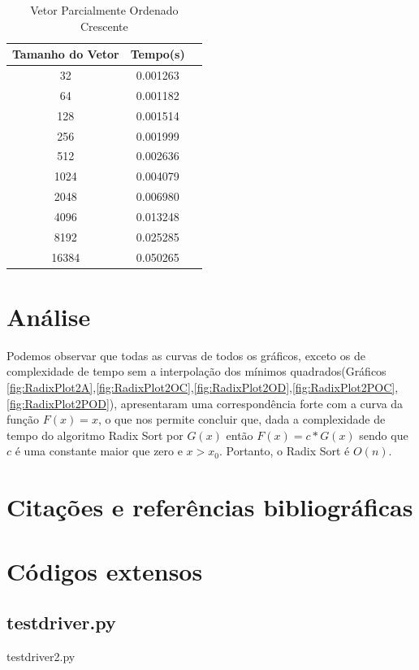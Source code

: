 \documentclass[12pt,a4paper,twoside]{report}
\begin{document}
\begin{table}[h]
  \centering
  \caption{Vetor Parcialmente Ordenado Crescente \label{tab:poc}}
  \begin{tabular}{ccc} \\\hline
  \textbf{Tamanho do Vetor}  & \textbf{Tempo(s)} \\\hline
  32                              & 0.001263          \\\hline
  64                              & 0.001182          \\\hline
  128                             & 0.001514          \\\hline
  256                             & 0.001999          \\\hline
  512                             & 0.002636          \\\hline
  1024                            & 0.004079          \\\hline
  2048                            & 0.006980          \\\hline
  4096                            & 0.013248
  \\\hline
  8192                            & 0.025285
  \\\hline
  16384                           & 0.050265
  \\\hline
  \end{tabular}
\end{table}


\chapter{Análise}

Podemos observar que todas as curvas de todos os gráficos, exceto os de complexidade de tempo sem a interpolação dos mínimos quadrados(Gráficos \ref{fig:RadixPlot2A},\ref{fig:RadixPlot2OC},\ref{fig:RadixPlot2OD},\ref{fig:RadixPlot2POC},\ref{fig:RadixPlot2POD}), apresentaram uma correspondência forte com a curva da função $F(x) = x$, o que nos permite concluir que, dada a complexidade de tempo do algoritmo Radix Sort por $G(x)$ então $F(x) = c * G(x)$ sendo que $c$ é uma constante maior que zero e $x > x_0$. Portanto, o Radix Sort é $O(n)$.

\chapter{Citações e referências bibliográficas}








\clearpage
{}
\appendix

\chapter{Códigos extensos \label{ap:testdriver}}
\section{testdriver.py}
 {testdriver2.py}
\end{document}
